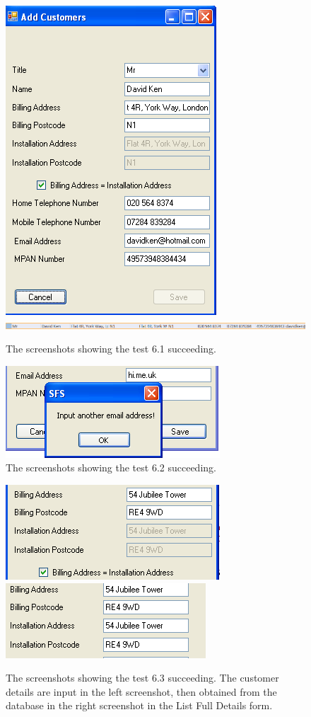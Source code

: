 \begin{figure}[ht]
\centering
\includegraphics[scale=0.5]{test6dot1scrot1}
\includegraphics[scale=0.5]{test6dot1scrot2}
\caption{The screenshots showing the test 6.1 succeeding.}
\label{fig:test_sixdotone}
\end{figure}

\begin{figure}[ht]
\centering
\includegraphics[scale=0.5]{test6dot2scrot}
\caption{The screenshots showing the test 6.2 succeeding.}
\label{fig:test_sixdottwo}
\end{figure}

\begin{figure}[ht]
\centering
\includegraphics[scale=0.5]{test6dot3scrot1}
\includegraphics[scale=0.5]{test6dot3scrot2}
\caption{The screenshots showing the test 6.3 succeeding.  The customer details are input in the left screenshot, then obtained from the database in the right screenshot in the List Full Details form.}
\label{fig:test_sixdotthree}
\end{figure}

